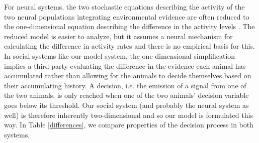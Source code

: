 \documentclass{pnastwo}
\begin{document}
\begin{article}
For neural systems, the two stochastic equations describing the activity of the two neural populations integrating environmental evidence are often reduced to the one-dimensional equation describing the difference in the activity levels \cite{Brown:2005fk,Bogacz:2006uq,Feng:2009kl}. The reduced model is easier to analyze, but it assumes a neural mechanism for calculating the difference in activity rates and there is no empirical basis for this. In social systems like our model system, the one dimensional simplification implies a third party evaluating the difference in the evidence each animal has accumulated rather than allowing for the animals to decide themselves based on their accumulating history.  A decision, i.e. the emission of a signal from one of the two animals, is only reached when one of the two animals' decision variable goes below its threshold. Our social system (and probably the neural system as well) is therefore inherently two-dimensional and so our model is formulated this way.  In Table \ref{differences}, we compare properties of the decision process in both systems.


\end{article}
\end{document}
